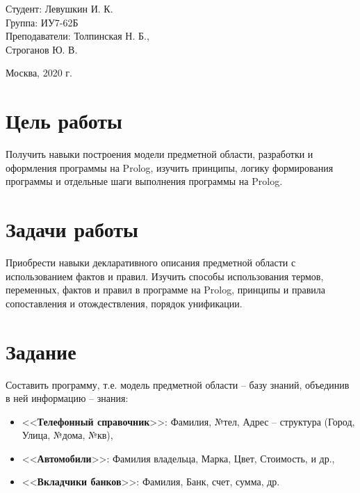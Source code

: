 \documentclass[a4paper,12pt]{article}
\begin{document}
	\vspace*{15mm} 	
	
	\large
	\begin{flushright}
		Студент: Левушкин И. К. \\
		Группа: ИУ7-62Б \\
		Преподаватели: Толпинская Н. Б., \\ Строганов Ю. В. \\
	\end{flushright}
	
	\vspace*{30mm}
	\begin{center}
		Москва, 2020 г.  
	\end{center}
	\thispagestyle{empty}
	
	
	\newpage
	
	\section*{Цель работы}
	
	Получить навыки построения модели предметной области, разработки и оформления программы на Prolog, изучить принципы, логику формирования программы и отдельные шаги выполнения программы на Prolog.
	
	\section*{Задачи работы}
	
	Приобрести навыки декларативного описания предметной области с использованием фактов и правил.
	Изучить способы использования термов, переменных, фактов и правил в программе на Prolog, принципы  и правила сопоставления и отождествления, порядок унификации.
	
	\section*{Задание}
	
	Составить программу, т.е. модель предметной области – базу знаний, объединив в ней информацию – знания:
	\begin{itemize}
		\item <<{\bf Телефонный справочник}>>: Фамилия, №тел, Адрес – структура (Город, Улица, №дома, №кв),
		\item <<{\bf Автомобили}>>: Фамилия владельца, Марка, Цвет, Стоимость, и др.,
		\item <<{\bf Вкладчики банков}>>: Фамилия, Банк, счет, сумма, др.
	\end{itemize}
\end{document}
